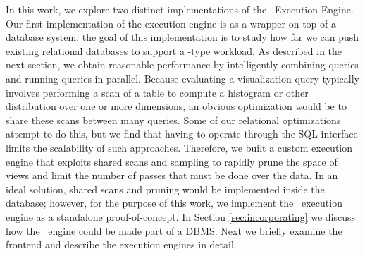In this work, we explore two distinct implementations of the \VizRecDB\ Execution
Engine. 
Our first implementation of the execution engine is as a wrapper on top of a database
system: the goal of this implementation is to study how far we can 
push existing relational databases to support a \VizRecDB-type workload.
As described in the next section, we obtain reasonable performance by
intelligently combining queries and running queries in parallel. 
Because evaluating a visualization query typically involves 
performing a scan of a table to compute  a histogram or other distribution 
over one or more dimensions, an obvious optimization would be to share 
these scans between many queries.  
Some of our relational optimizations attempt to do this, 
but we find that having to operate through the SQL interface 
limits the scalability of such approaches.  
Therefore, we built a custom execution engine that exploits 
shared scans and sampling to rapidly prune the space of views and 
limit the number of passes that must be done over the data.
In an ideal solution, shared scans and pruning would be implemented inside the
database; however, for the purpose of this work, we implement the \VizRecDB\
execution engine as a standalone proof-of-concept. 
In Section \ref{sec:incorporating} we discuss how the \VizRecDB\ engine could be
made part of a DBMS.
Next we briefly examine the \VizRecDB frontend and describe the execution engines
in detail.


% 



